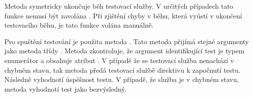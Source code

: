 Metoda  symetricky ukončuje běh testovací služby. V určitých případech tato funkce nemusí být zavolána . Při zjištění chyby v běhu, která vyústí v ukončení testovacího běhu, je tato funkce volána manuálně.

Pro spuštění testování je použita metoda . Tato metoda přijímá stejné argumenty jako metoda  třídy . Metoda zkontroluje, že argument identifikující test je typem enumerátor a obsahuje atribut . V případě že se testovací služba nenachází v chybném stavu, tak metoda předá testovací službě direktivu k započnutí testu. Následně vyhodnotí úspěšnost testu. V případě, že služba je v chybném stavu, metoda vyhodnotí test jako bezvýsledný. 
 